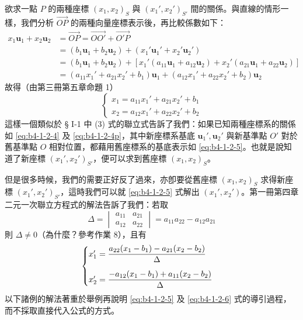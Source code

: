 欲求一點 $P$ 的兩種座標 $(x_1, x_2)_S$ 與 $(x_1', x_2')_{S'}$ 間的關係。與直線的情形一樣，我們分析 $\vec{OP}$ 的兩種向量座標表示後，再比較係數如下：
\begin{align*}
x_1 \mathbf{u}_1 + x_2 \mathbf{u}_2 &= \vec{OP} = \vec{OO'} + \vec{O'P} \\
&= (b_1 \mathbf{u}_1 + b_2 \mathbf{u}_2) + (x_1' \mathbf{u}_1' + x_2' \mathbf{u}_2') \\
&= (b_1 \mathbf{u}_1 + b_2 \mathbf{u}_2) + [x_1' (a_{11}\mathbf{u}_1 + a_{12}\mathbf{u}_2) + x_2' (a_{21}\mathbf{u}_1 + a_{22}\mathbf{u}_2)] \\
&= (a_{11}x_1' + a_{21}x_2' + b_1)\mathbf{u}_1 + (a_{12}x_1' + a_{22}x_2' + b_2)\mathbf{u}_2
\end{align*}
故得（由第三冊第五章命題 1）
\begin{equation}
\begin{cases}
x_1 = a_{11} x_1' + a_{21} x_2' + b_1 \\
x_2 = a_{12} x_1' + a_{22} x_2' + b_2
\end{cases} \label{eq:b4-1-2-5}
\end{equation}
這樣一個類似於 § I-1 中 (3) 式的聯立式告訴了我們：如果已知兩種座標系的關係如 \eqref{eq:b4-1-2-4} 及 \eqref{eq:b4-1-2-4p}，其中新座標系基底 $\mathbf{u}_1', \mathbf{u}_2'$ 與新基準點 $O'$ 對於舊基準點 $O$ 相對位置，都藉用舊座標系的基底表示如 \eqref{eq:b4-1-2-5}。也就是說知道了新座標 $(x_1', x_2')_{S'}$，便可以求到舊座標 $(x_1, x_2)_S$。

但是很多時候，我們的需要正好反了過來，亦卽要從舊座標 $(x_1, x_2)_S$ 求得新座標 $(x_1', x_2')_{S'}$，這時我們可以就 \eqref{eq:b4-1-2-5} 式解出 $(x_1', x_2')$。第一冊第四章二元一次聯立方程式的解法告訴了我們：若取
\[ \Delta = \begin{vmatrix} a_{11} & a_{21} \\ a_{12} & a_{22} \end{vmatrix} = a_{11}a_{22} - a_{12}a_{21} \]
則 $\Delta \neq 0$（為什麼？參考作業 8），且有
\begin{equation}
\begin{cases}
x_1' = \dfrac{a_{22}(x_1 - b_1) - a_{21}(x_2 - b_2)}{\Delta} \\ \noalign{\vskip 1em}
x_2' = \dfrac{-a_{12}(x_1 - b_1) + a_{11}(x_2 - b_2)}{\Delta}
\end{cases} \label{eq:b4-1-2-6}
\end{equation}
以下諸例的解法著重於舉例再說明 \eqref{eq:b4-1-2-5} 及 \eqref{eq:b4-1-2-6} 式的導引過程，而不採取直接代入公式的方式。

